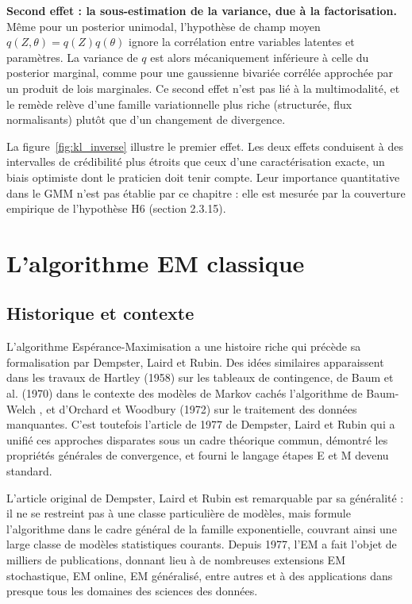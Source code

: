 \textbf{Second effet : la sous-estimation de la variance, due à la factorisation. }Même pour un posterior unimodal, l'hypothèse de champ moyen $q(Z, \theta) = q(Z)q(\theta)$ ignore la corrélation entre variables latentes et paramètres. La variance de $q$ est alors mécaniquement inférieure à celle du posterior marginal, comme pour une gaussienne bivariée corrélée approchée par un produit de lois marginales. Ce second effet n'est pas lié à la multimodalité, et le remède relève d'une famille variationnelle plus riche (structurée, flux normalisants) plutôt que d'un changement de divergence.

La figure~\ref{fig:kl_inverse} illustre le premier effet. Les deux effets conduisent à des intervalles de crédibilité plus étroits que ceux d'une caractérisation exacte, un biais optimiste dont le praticien doit tenir compte. Leur importance quantitative dans le GMM n'est pas établie par ce chapitre : elle est mesurée par la couverture empirique de l'hypothèse H6 (section 2.3.15).



\section{L'algorithme EM classique}
\subsection{Historique et contexte}
L'algorithme Espérance-Maximisation a une histoire riche qui précède sa formalisation par Dempster, Laird et Rubin. Des idées similaires apparaissent dans les travaux de Hartley (1958) sur les tableaux de contingence, de Baum et al. (1970) dans le contexte des modèles de Markov cachés  l'algorithme de Baum-Welch , et d'Orchard et Woodbury (1972) sur le traitement des données manquantes. C'est toutefois l'article de 1977 de Dempster, Laird et Rubin qui a unifié ces approches disparates sous un cadre théorique commun, démontré les propriétés générales de convergence, et fourni le langage  étapes E et M  devenu standard.

L'article original de Dempster, Laird et Rubin est remarquable par sa généralité : il ne se restreint pas à une classe particulière de modèles, mais formule l'algorithme dans le cadre général de la famille exponentielle, couvrant ainsi une large classe de modèles statistiques courants. Depuis 1977, l'EM a fait l'objet de milliers de publications, donnant lieu à de nombreuses extensions  EM stochastique, EM online, EM généralisé, entre autres  et à des applications dans presque tous les domaines des sciences des données.


